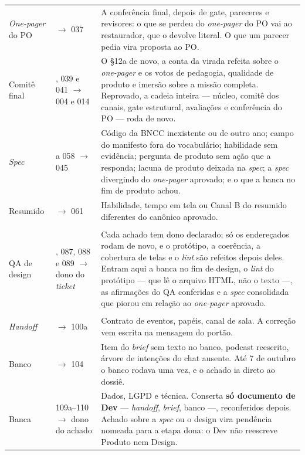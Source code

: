 \documentclass[11pt,a4paper]{article}
\begin{document}
\begin{center}
\begin{longtable}{>{\raggedright\arraybackslash}p{2.3cm}>{\raggedright\arraybackslash}p{4.0cm}p{8.3cm}}
\addlinespace
\emph{One-pager} do PO & 035 $\rightarrow$ 037 & A conferência final, depois de gate, pareceres e revisores: o que se perdeu do \emph{one-pager} do PO vai ao restaurador, que o devolve literal. O que um parecer pedia vira proposta ao PO. \\
\addlinespace
Comitê final & 038, 039 e 041 $\rightarrow$ 004 e 014 & O \S12a de novo, a conta da virada refeita sobre o \emph{one-pager} e os votos de pedagogia, qualidade de produto e imersão sobre a missão completa. Reprovado, a cadeia inteira --- núcleo, comitê dos canais, gate estrutural, avaliações e conferência do PO --- roda de novo. \\
\addlinespace
\emph{Spec} & 046 a 058 $\rightarrow$ 045 & Código da BNCC inexistente ou de outro ano; campo do manifesto fora do vocabulário; habilidade sem evidência; pergunta de produto sem ação que a responda; lacuna de produto deixada na \emph{spec}; a \emph{spec} divergindo do \emph{one-pager} aprovado; e o que a banca no fim de produto achou. \\
\addlinespace
Resumido & 062 $\rightarrow$ 061 & Habilidade, tempo em tela ou Canal B do resumido diferentes do canônico aprovado. \\
\addlinespace
\multicolumn{3}{@{}l}{\sffamily\bfseries\scriptsize\color{unLavanda}DESIGN} \\[2pt]
QA de design & 081, 087, 088 e 089 $\rightarrow$ dono do \emph{ticket} & Cada achado tem dono declarado; só os endereçados rodam de novo, e o protótipo, a coerência, a cobertura de telas e o \emph{lint} são refeitos depois deles. Entram aqui a banca no fim de design, o \emph{lint} do protótipo --- que lê o arquivo HTML, não o texto ---, as afirmações do QA conferidas e a \emph{spec} consolidada que piorou em relação ao \emph{one-pager} aprovado. \\
\addlinespace
\multicolumn{3}{@{}l}{\sffamily\bfseries\scriptsize\color{unLavanda}DEV} \\[2pt]
\emph{Handoff} & 101 $\rightarrow$ 100a & Contrato de eventos, papéis, canal de sala. A correção vem escrita na mensagem do portão. \\
\addlinespace
Banco & 105 $\rightarrow$ 104 & Item do \emph{brief} sem texto no banco, podcast reescrito, árvore de intenções do chat ausente. Até 7 de outubro o banco rodava uma vez, e o achado ia direto ao dossiê. \\
\addlinespace
Banca & 109a--110 $\rightarrow$ dono do achado & Dados, LGPD e técnica. Conserta \textbf{só documento de Dev} --- \emph{handoff}, \emph{brief}, banco ---, reconferidos depois. Achado sobre a \emph{spec} ou o design vira pendência nomeada para a etapa dona: o Dev não reescreve Produto nem Design. \\

\end{longtable}
\end{center}
\end{document}
